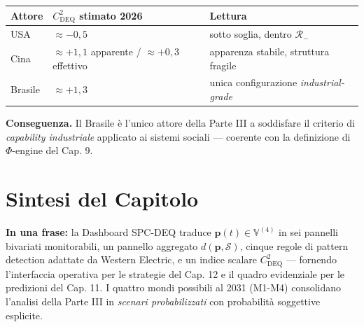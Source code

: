 {\def\LTcaptype{none} %
{\small\begin{longtable}[]{@{}
  >{\raggedright\arraybackslash}p{}
  >{\raggedright\arraybackslash}p{}
  >{\raggedright\arraybackslash}p{}@{}}
\toprule\noalign{}
\begin{minipage}[b]{\linewidth}\raggedright
Attore
\end{minipage} & \begin{minipage}[b]{\linewidth}\raggedright
\(C_{\text{DEQ}}^2\) stimato 2026
\end{minipage} & \begin{minipage}[b]{\linewidth}\raggedright
Lettura
\end{minipage} \\
\midrule\noalign{}
\endhead
\bottomrule\noalign{}
\endlastfoot
USA & \(\approx -0{,}5\) & sotto soglia, dentro \(\mathcal{R}_-\) \\
Cina & \(\approx +1{,}1\) apparente / \(\approx +0{,}3\) effettivo &
apparenza stabile, struttura fragile \\
Brasile & \(\approx +1{,}3\) & unica configurazione
\emph{industrial-grade} \\
\end{longtable}}
}

\Hypoth{} \textbf{Conseguenza.} Il Brasile è l'unico attore della Parte
III a soddisfare il criterio di \emph{capability industriale} applicato
ai sistemi sociali --- coerente con la definizione di \(\Phi\)-engine
del Cap. 9.



\section{Sintesi del Capitolo}\label{sintesi-del-capitolo}

\Proved{} \textbf{In una frase:} la Dashboard SPC-DEQ traduce
\(\boldsymbol{p}(t) \in \mathbb{V}^{(4)}\) in sei pannelli bivariati
monitorabili, un pannello aggregato \(d(\boldsymbol{p}, \mathcal{S})\),
cinque regole di pattern detection adattate da Western Electric, e un
indice scalare \(C_{\text{DEQ}}^2\) --- fornendo l'interfaccia operativa
per le strategie del Cap. 12 e il quadro evidenziale per le predizioni
del Cap. 11. I quattro mondi possibili al 2031 (M1-M4) consolidano
l'analisi della Parte III in \emph{scenari probabilizzati} con
probabilità soggettive esplicite.


